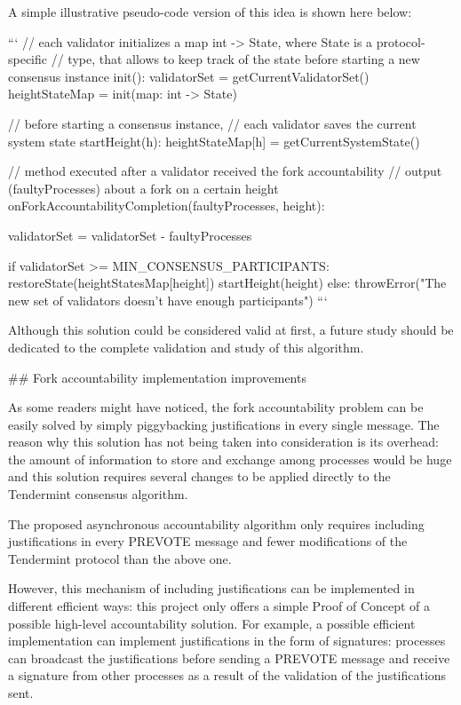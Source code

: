 \documentclass[a4paper,11pt,oneside]{report}
\begin{document}
\begin{markdown}
A simple illustrative pseudo-code version of this idea is shown here below:

    ```
    // each validator initializes a map int -> State, where State is a protocol-specific
    // type, that allows to keep track of the state before starting a new consensus instance
    init():
        validatorSet = getCurrentValidatorSet()
        heightStateMap = init(map: int -> State)

    // before starting a consensus instance, 
    // each validator saves the current system state
    startHeight(h):
        heightStateMap[h] = getCurrentSystemState()	

    // method executed after a validator received the fork accountability
    // output (faultyProcesses) about a fork on a certain height
    onForkAccountabilityCompletion(faultyProcesses, height):

        validatorSet = validatorSet - faultyProcesses

        if validatorSet >= MIN_CONSENSUS_PARTICIPANTS:
            restoreState(heightStatesMap[height])
            startHeight(height)
        else:
            throwError("The new set of validators doesn't have enough participants")
    ```

Although this solution could be considered valid at first, a future study should be dedicated to the complete validation and study of this algorithm.


## Fork accountability implementation improvements

As some readers might have noticed, the fork accountability problem can be easily solved by simply piggybacking justifications in every single message.
The reason why this solution has not being taken into consideration is its overhead: the amount of information to store and exchange among processes would be huge and this solution requires several changes to be applied directly to the Tendermint consensus algorithm. 

The proposed asynchronous accountability algorithm only requires including justifications in every PREVOTE message and fewer modifications of the Tendermint protocol than the above one.

However, this mechanism of including justifications can be implemented in different efficient ways: this project only offers a simple Proof of Concept of a possible high-level accountability solution.
For example, a possible efficient implementation can implement justifications in the form of signatures: processes can broadcast the justifications before sending a PREVOTE message and receive a signature from other processes as a result of the validation of the justifications sent.


\end{markdown}
\end{document}
